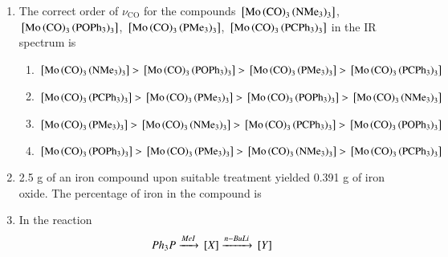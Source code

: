 \documentclass[journal,12pt,onecolumn]{IEEEtran}
\theoremstyle{remark}
\begin{document}
\begin{enumerate}[resume]
\item The 
 correct order of $\nu_{\mathrm{CO}}$ for the compounds 
$\mathrm{{}\left[Mo\left(CO\right)_3\left(NMe_3\right)_3\right]}$, 
$\mathrm{{}\left[Mo\left(CO\right)_3\left(POPh_3\right)_3\right]}$, 
$\mathrm{{}\left[Mo\left(CO\right)_3\left(PMe_3\right)_3\right]}$, 
$\mathrm{{}\left[Mo\left(CO\right)_3\left(PCPh_3\right)_3\right]}$ in the IR spectrum is 

\begin{enumerate}
\item $\mathrm{{}\left[Mo\left(CO\right)_3\left(NMe_3\right)_3\right]} > \mathrm{{}\left[Mo\left(CO\right)_3\left(POPh_3\right)_3\right]} > \mathrm{{}\left[Mo\left(CO\right)_3\left(PMe_3\right)_3\right]} > \mathrm{{}\left[Mo\left(CO\right)_3\left(PCPh_3\right)_3\right]}$
\item $\mathrm{{}\left[Mo\left(CO\right)_3\left(PCPh_3\right)_3\right]} > \mathrm{{}\left[Mo\left(CO\right)_3\left(PMe_3\right)_3\right]} > \mathrm{{}\left[Mo\left(CO\right)_3\left(POPh_3\right)_3\right]} > \mathrm{{}\left[Mo\left(CO\right)_3\left(NMe_3\right)_3\right]}$
\item $\mathrm{{}\left[Mo\left(CO\right)_3\left(PMe_3\right)_3\right]} > \mathrm{{}\left[Mo\left(CO\right)_3\left(NMe_3\right)_3\right]} > \mathrm{{}\left[Mo\left(CO\right)_3\left(PCPh_3\right)_3\right]} > \mathrm{{}\left[Mo\left(CO\right)_3\left(POPh_3\right)_3\right]}$
\item $\mathrm{{}\left[Mo\left(CO\right)_3\left(POPh_3\right)_3\right]} > \mathrm{{}\left[Mo\left(CO\right)_3\left(PMe_3\right)_3\right]} > \mathrm{{}\left[Mo\left(CO\right)_3\left(NMe_3\right)_3\right]} > \mathrm{{}\left[Mo\left(CO\right)_3\left(PCPh_3\right)_3\right]}$

\hfill{}
\end{enumerate}



 
\item 2.5 g of an iron compound upon suitable treatment yielded 0.391 g of iron oxide.
 The percentage of iron in the compound is 
    \begin{enumerate}
        \hfill{}
    \end{enumerate}



\item In the reaction
    \begin{align*}
     Ph_3P \xrightarrow{MeI} {}\left[X\right] \xrightarrow{n-BuLi} {}\left[Y\right]
    \end{align*}
    

\end{enumerate}
\end{document}
